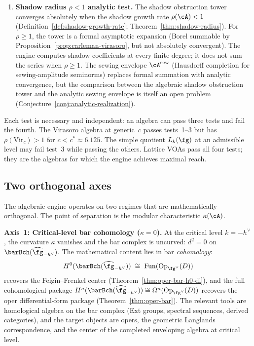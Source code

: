 \begin{enumerate}
\item \textbf{Shadow radius $\rho < 1$ analytic test.}
 The shadow obstruction tower converges absolutely when the shadow
 growth rate $\rho(\cA) < 1$
 (Definition~\ref{def:shadow-growth-rate};
 Theorem~\ref{thm:shadow-radius}).
 For $\rho \geq 1$, the tower is a formal asymptotic
 expansion (Borel summable by
 Proposition~\ref{prop:carleman-virasoro},
 but not absolutely convergent).
 The engine computes shadow coefficients at every finite
 degree; it does not sum the series when $\rho \geq 1$.
 The sewing envelope $\cA^{\mathrm{sew}}$
 (Hausdorff completion for sewing-amplitude seminorms)
 replaces formal summation with analytic convergence, but
 the comparison between the algebraic shadow obstruction tower and the
 analytic sewing envelope is itself an open problem
 (Conjecture~\ref{conj:analytic-realization}).
\end{enumerate}

\noindent
Each test is necessary and independent: an algebra can pass
three tests and fail the fourth. The Virasoro algebra at
generic~$c$ passes tests~1--3 but has $\rho(\mathrm{Vir}_c)
> 1$ for $c < c^* \approx 6.125$.
The simple quotient $L_k(\fg)$ at an admissible level may
fail test~3 while passing the others.
Lattice VOAs pass all four tests; they are the algebras for
which the engine achieves maximal reach.

\subsection{Two orthogonal axes}
\label{subsec:concordance-two-orthogonal-axes}

The algebraic engine operates on two regimes that are
mathematically orthogonal. The point of separation is the
modular characteristic $\kappa(\cA)$.

\medskip\noindent
\textbf{Axis~1: Critical-level bar cohomology
($\kappa = 0$).}\enspace
At the critical level $k = -h^\vee$, the curvature $\kappa$
vanishes and the bar complex is uncurved: $d^2 = 0$ on
$\barBch(\widehat{\fg}_{-h^\vee})$. The mathematical content
lies in bar \emph{cohomology}:
\[
 H^0(\barBch(\widehat{\fg}_{-h^\vee}))
 \;\cong\;
 \operatorname{Fun}(\operatorname{Op}_{\fg^\vee}(D))
\]
recovers the Feigin--Frenkel center
(Theorem~\ref{thm:oper-bar-h0-dl}), and the full
cohomological package
$H^n(\barBch(\widehat{\fg}_{-h^\vee})) \cong
\Omega^n(\operatorname{Op}_{\fg^\vee}(D))$
recovers the oper differential-form package
(Theorem~\ref{thm:oper-bar}).
The relevant tools are homological algebra on the bar
complex (Ext groups, spectral sequences, derived categories),
and the target objects are opers, the geometric Langlands
correspondence, and the center of the completed
enveloping algebra at critical level.

